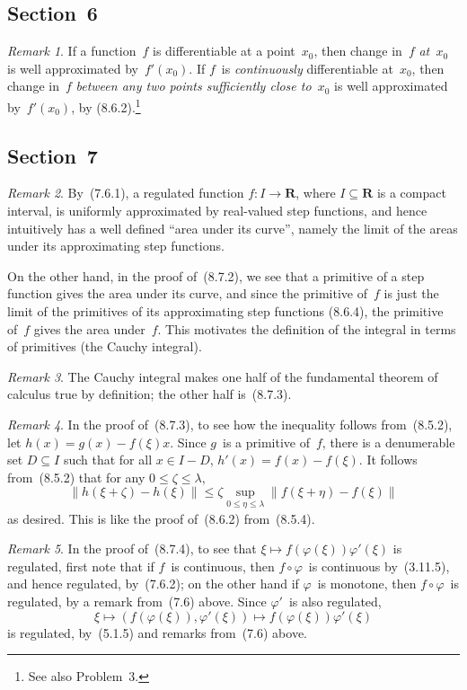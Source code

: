 \documentclass[letterpaper,12pt]{article}
\newcommand{\R}{\mathbf{R}}
\newcommand{\after}{\circ}
\newcommand{\norm}[1]{\lVert{#1}\rVert}
\theoremstyle{plain}
\theoremstyle{definition}
\theoremstyle{remark}
\newtheorem*{rmk}{Remark}
\begin{document}
\subsection*{Section~6}
\begin{rmk}
If a function~\(f\) is differentiable at a point~\(x_0\), then change in~\(f\) \emph{at~\(x_0\)} is well approximated by~\(f'(x_0)\). If \(f\)~is \emph{continuously} differentiable at~\(x_0\), then change in~\(f\) \emph{between any two points sufficiently close to~\(x_0\)} is well approximated by~\(f'(x_0)\), by (8.6.2).\footnote{See also Problem~3.}
\end{rmk}

\subsection*{Section~7}
\begin{rmk}
By~(7.6.1), a regulated function \(f:I\to\R\), where \(I\subseteq\R\) is a compact interval, is uniformly approximated by real-valued step functions, and hence intuitively has a well defined ``area under its curve'', namely the limit of the areas under its approximating step functions.

On the other hand, in the proof of~(8.7.2), we see that a primitive of a step function gives the area under its curve, and since the primitive of~\(f\) is just the limit of the primitives of its approximating step functions (8.6.4), the primitive of~\(f\) gives the area under~\(f\). This motivates the definition of the integral in terms of primitives (the Cauchy integral).
\end{rmk}

\begin{rmk}
The Cauchy integral makes one half of the fundamental theorem of calculus true by definition; the other half is~(8.7.3).
\end{rmk}

\begin{rmk}
In the proof of~(8.7.3), to see how the inequality follows from~(8.5.2), let \(h(x)=g(x)-f(\xi)x\). Since \(g\)~is a primitive of~\(f\), there is a denumerable set \(D\subseteq I\) such that for all \(x\in I-D\), \(h'(x)=f(x)-f(\xi)\). It follows from~(8.5.2) that for any \(0\le\zeta\le\lambda\),
\[\norm{h(\xi+\zeta)-h(\xi)}\le\zeta\sup_{0\le\eta\le\lambda}\norm{f(\xi+\eta)-f(\xi)}\]
as desired. This is like the proof of~(8.6.2) from~(8.5.4).
\end{rmk}

\begin{rmk}
In the proof of~(8.7.4), to see that \(\xi\mapsto f(\varphi(\xi))\varphi'(\xi)\) is regulated, first note that if \(f\)~is continuous, then \(f\after\varphi\)~is continuous by~(3.11.5), and hence regulated, by~(7.6.2); on the other hand if \(\varphi\)~is monotone, then \(f\after\varphi\)~is regulated, by a remark from~(7.6) above. Since \(\varphi'\)~is also regulated,
\[\xi\mapsto(f(\varphi(\xi)),\varphi'(\xi))\mapsto f(\varphi(\xi))\varphi'(\xi)\]
is regulated, by~(5.1.5) and remarks from~(7.6) above.
\end{rmk}
\end{document}
